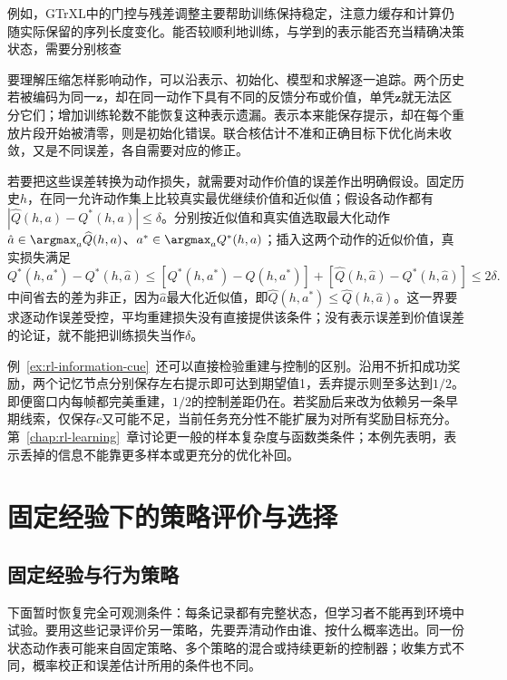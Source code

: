 例如，GTrXL中的门控与残差调整主要帮助训练保持稳定，注意力缓存和计算仍随实际保留的序列长度变化。能否较顺利地训练，与学到的表示能否充当精确决策状态，需要分别核查

要理解压缩怎样影响动作，可以沿表示、初始化、模型和求解逐一追踪。两个历史若被编码为同一$\bm z$，却在同一动作下具有不同的反馈分布或价值，单凭$\bm z$就无法区分它们；增加训练轮数不能恢复这种表示遗漏。表示本来能保存提示，却在每个重放片段开始被清零，则是初始化错误。联合核估计不准和正确目标下优化尚未收敛，又是不同误差，各自需要对应的修正。

若要把这些误差转换为动作损失，就需要对动作价值的误差作出明确假设。固定历史$h$，在同一允许动作集上比较真实最优继续价值和近似值；假设各动作都有
$|\widehat Q(h,a)-Q^*(h,a)|\leq\delta$。分别按近似值和真实值选取最大化动作
$\hat a\in\argmax_a\widehat Q(h,a)$、$a^*\in\argmax_aQ^*(h,a)$；插入这两个动作的近似价值，真实损失满足
\[
  Q^*(h,a^*)-Q^*(h,\hat a)
  \leq
  [Q^*(h,a^*)-\widehat Q(h,a^*)]
  +[\widehat Q(h,\hat a)-Q^*(h,\hat a)]
  \leq2\delta.
\]
中间省去的差为非正，因为$\hat a$最大化近似值，即$\widehat Q(h,a^*)\leq\widehat Q(h,\hat a)$。这一界要求逐动作误差受控，平均重建损失没有直接提供该条件；没有表示误差到价值误差的论证，就不能把训练损失当作$\delta$。

例~\ref{ex:rl-information-cue}~还可以直接检验重建与控制的区别。沿用不折扣成功奖励，两个记忆节点分别保存左右提示即可达到期望值1，丢弃提示则至多达到$1/2$。即便窗口内每帧都完美重建，$1/2$的控制差距仍在。若奖励后来改为依赖另一条早期线索，仅保存$c$又可能不足，当前任务充分性不能扩展为对所有奖励目标充分。第~\ref{chap:rl-learning}~章讨论更一般的样本复杂度与函数类条件；本例先表明，表示丢掉的信息不能靠更多样本或更充分的优化补回。

\section{固定经验下的策略评价与选择}
\label{sec:rl-information-evaluation}

\subsection{固定经验与行为策略}
\label{sec:rl-information-logging}

下面暂时恢复完全可观测条件：每条记录都有完整状态，但学习者不能再到环境中试验。要用这些记录评价另一策略，先要弄清动作由谁、按什么概率选出。同一份状态动作表可能来自固定策略、多个策略的混合或持续更新的控制器；收集方式不同，概率校正和误差估计所用的条件也不同。

